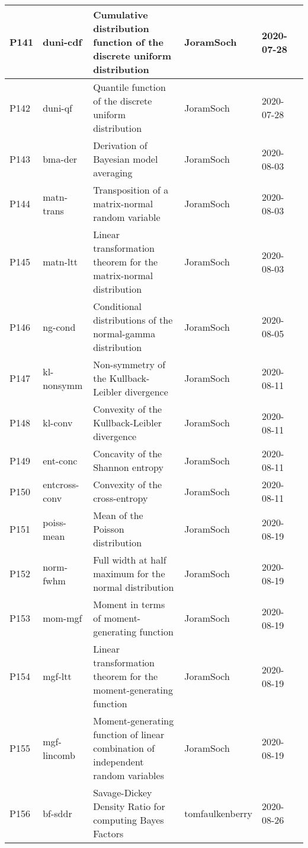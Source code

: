 \documentclass[a4paper,12pt,twoside]{book}
\begin{document}
\begin{longtable}{|p{1cm}|p{2cm}|p{6.5cm}|p{3cm}|p{2cm}|c|}
P141 & duni-cdf & Cumulative distribution function of the discrete uniform distribution & JoramSoch & 2020-07-28 & \pageref{sec:duni-cdf} \\ \hline
P142 & duni-qf & Quantile function of the discrete uniform distribution & JoramSoch & 2020-07-28 & \pageref{sec:duni-qf} \\ \hline
P143 & bma-der & Derivation of Bayesian model averaging & JoramSoch & 2020-08-03 & \pageref{sec:bma-der} \\ \hline
P144 & matn-trans & Transposition of a matrix-normal random variable & JoramSoch & 2020-08-03 & \pageref{sec:matn-trans} \\ \hline
P145 & matn-ltt & Linear transformation theorem for the matrix-normal distribution & JoramSoch & 2020-08-03 & \pageref{sec:matn-ltt} \\ \hline
P146 & ng-cond & Conditional distributions of the normal-gamma distribution & JoramSoch & 2020-08-05 & \pageref{sec:ng-cond} \\ \hline
P147 & kl-nonsymm & Non-symmetry of the Kullback-Leibler divergence & JoramSoch & 2020-08-11 & \pageref{sec:kl-nonsymm} \\ \hline
P148 & kl-conv & Convexity of the Kullback-Leibler divergence & JoramSoch & 2020-08-11 & \pageref{sec:kl-conv} \\ \hline
P149 & ent-conc & Concavity of the Shannon entropy & JoramSoch & 2020-08-11 & \pageref{sec:ent-conc} \\ \hline
P150 & entcross-conv & Convexity of the cross-entropy & JoramSoch & 2020-08-11 & \pageref{sec:entcross-conv} \\ \hline
P151 & poiss-mean & Mean of the Poisson distribution & JoramSoch & 2020-08-19 & \pageref{sec:poiss-mean} \\ \hline
P152 & norm-fwhm & Full width at half maximum for the normal distribution & JoramSoch & 2020-08-19 & \pageref{sec:norm-fwhm} \\ \hline
P153 & mom-mgf & Moment in terms of moment-generating function & JoramSoch & 2020-08-19 & \pageref{sec:mom-mgf} \\ \hline
P154 & mgf-ltt & Linear transformation theorem for the moment-generating function & JoramSoch & 2020-08-19 & \pageref{sec:mgf-ltt} \\ \hline
P155 & mgf-lincomb & Moment-generating function of linear combination of independent random variables & JoramSoch & 2020-08-19 & \pageref{sec:mgf-lincomb} \\ \hline
P156 & bf-sddr & Savage-Dickey Density Ratio for computing Bayes Factors & tomfaulkenberry & 2020-08-26 & \pageref{sec:bf-sddr} \\ \hline

\end{longtable}
\end{document}
